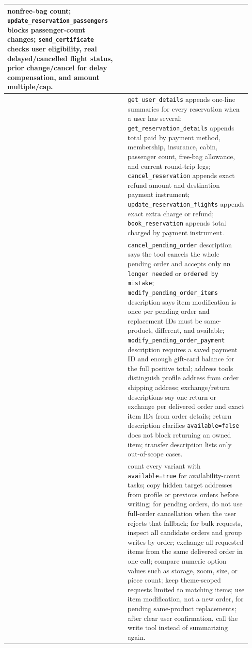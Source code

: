 \begin{table}[t]
\begin{tabular}{>{\centering\arraybackslash}m{}>{\centering\arraybackslash}m{}p{}}
nonfree-bag count; \texttt{update\_reservation\_passengers} blocks passenger-count changes;
\texttt{send\_certificate} checks user eligibility, real delayed/cancelled flight status,
prior change/cancel for delay compensation, and amount multiple/cap. \\
\cmidrule(lr){2-3}
& \multirow{5}{*}{Trajectory Regulation Layer}
& \texttt{get\_user\_details} appends one-line summaries for every reservation when a user
has several; \texttt{get\_reservation\_details} appends total paid by payment method,
membership, insurance, cabin, passenger count, free-bag allowance, and current
round-trip legs; \texttt{cancel\_reservation} appends exact refund amount and destination
payment instrument; \texttt{update\_reservation\_flights} appends exact extra charge or
refund; \texttt{book\_reservation} appends total charged by payment instrument. \\
\midrule
\multirow{30}{*}{\centering Retail}
& \multirow{8}{*}{Environment Contract Layer}
& \texttt{cancel\_pending\_order} description says the tool cancels the whole pending order
and accepts only \texttt{no longer needed} or \texttt{ordered by mistake};
\texttt{modify\_pending\_order\_items} description says item modification is once per pending
order and replacement IDs must be same-product, different, and available;
\texttt{modify\_pending\_order\_payment} description requires a saved payment ID and enough
gift-card balance for the full positive total; address tools distinguish profile
address from order shipping address; exchange/return descriptions say one return
or exchange per delivered order and exact item IDs from order details; return
description clarifies \texttt{available=false} does not block returning an owned
item; transfer description lists only out-of-scope cases. \\
\cmidrule(lr){2-3}
& \multirow{6}{*}{Procedural Skill Layer}
& count every variant with \texttt{available=true} for availability-count tasks;
copy hidden target addresses from profile or previous orders before writing;
for pending orders, do not use full-order cancellation when the user rejects that
fallback; for bulk requests, inspect all candidate orders and group writes by
order; exchange all requested items from the same delivered order in one call;
compare numeric option values such as storage, zoom, size, or piece count; keep
theme-scoped requests limited to matching items; use item modification, not a new
order, for pending same-product replacements; after clear user confirmation,
call the write tool instead of summarizing again. \\

\end{tabular}
\end{table}

